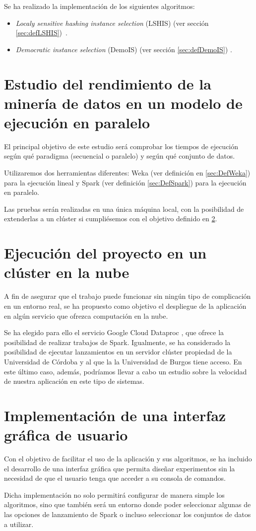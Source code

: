 Se ha realizado la implementación de los siguientes algoritmos:

\begin{itemize}
	\item \textit{Localy sensitive hashing instance selection} (LSHIS) (ver sección \ref{sec:defLSHIS})~\cite{LSHISPaper}.
	\item \textit{Democratic instance selection} (DemoIS) (ver sección \ref{sec:defDemoIS}) \cite{DemoISPaper}.
\end{itemize}


\section{Estudio del rendimiento de la minería de datos en un modelo de ejecución en paralelo}\label{sec:estudio}

El principal objetivo de este estudio será comprobar los tiempos de ejecución según qué paradigma (secuencial o paralelo) y según qué conjunto de datos.

Utilizaremos dos herramientas diferentes: Weka (ver definición en \ref{sec:DefWeka}) para la ejecución lineal y Spark (ver definición \ref{sec:DefSpark}) para la ejecución en paralelo.

Las pruebas serán realizadas en una única máquina local, con la posibilidad de extenderlas a un clúster si cumpliésemos con el objetivo definido en \ref{sec:ejecucionNube}.

\section{Ejecución del proyecto en un clúster en la nube}\label{sec:ejecucionNube}

A fin de asegurar que el trabajo puede funcionar sin ningún tipo de complicación en un entorno real, se ha propuesto como objetivo el despliegue de la aplicación en algún servicio que ofrezca computación en la nube.

Se ha elegido para ello el servicio Google Cloud Dataproc \cite{dataprocSoft}, que ofrece la posibilidad de realizar trabajos de Spark. Igualmente, se ha considerado la posibilidad de ejecutar lanzamientos en un servidor clúster propiedad de la Universidad de Córdoba y al que la la Universidad de Burgos tiene acceso. En este último caso, además, podríamos llevar a cabo un estudio sobre la velocidad de nuestra aplicación en este tipo de sistemas.


\section{Implementación de una interfaz gráfica de usuario}

Con el objetivo de facilitar el uso de la aplicación y sus algoritmos, se ha incluido el desarrollo de una interfaz gráfica que permita diseñar experimentos sin la necesidad de que el usuario tenga que acceder a su consola de comandos.

Dicha implementación no solo permitirá configurar de manera simple los algoritmos, sino que también será un entorno donde poder seleccionar algunas de las opciones de lanzamiento de Spark o incluso seleccionar los conjuntos de datos a utilizar.

